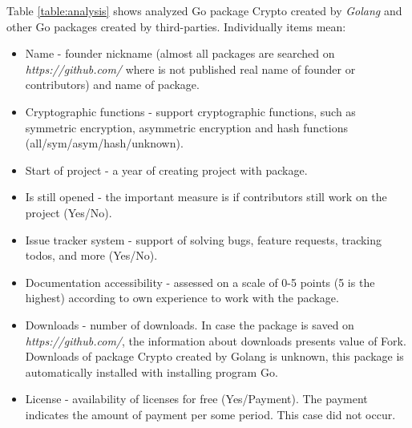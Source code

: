 \documentclass[
  twoside, 12pt, 
  printed, %
  notable,   %
  lof,     %
  lot,     %
]{fithesis3}
\begin{document}
Table \ref{table:analysis} shows analyzed Go package Crypto created by \textit{Golang} and other Go 
packages created by third-parties. Individually items mean:
\vskip0.1in
\begin{itemize}[leftmargin=2em,rightmargin=1em,itemsep=0.75\parskip,parsep=0em,topsep=0em,partopsep=0em]
\item Name - founder nickname (almost all packages are searched on \textit{https://github.com/} where is not published real name of founder or contributors) and name of package.
\item Cryptographic functions - support cryptographic functions, such as symmetric encryption, asymmetric encryption and hash functions (all/sym/asym/hash/unknown).
\item Start of project - a year of creating project with package.
\item Is still opened - the important measure is if contributors still work on the project (Yes/No).
\item Issue tracker system - support of solving bugs, feature requests, tracking todos, and more (Yes/No).
\item Documentation accessibility - assessed on a scale of 0-5 points (5 is the highest) according to own experience to work with the package.
\item Downloads - number of downloads. In case the package is saved on \textit{https://github.com/}, the information about downloads presents value of Fork. Downloads of package Crypto created by Golang is unknown, this package is automatically installed with installing program Go.  
\item License - availability of licenses for free (Yes/Payment). The payment indicates the amount of payment per some period. This case did not occur.
\end{itemize}
\vskip0.1in
\end{document}
